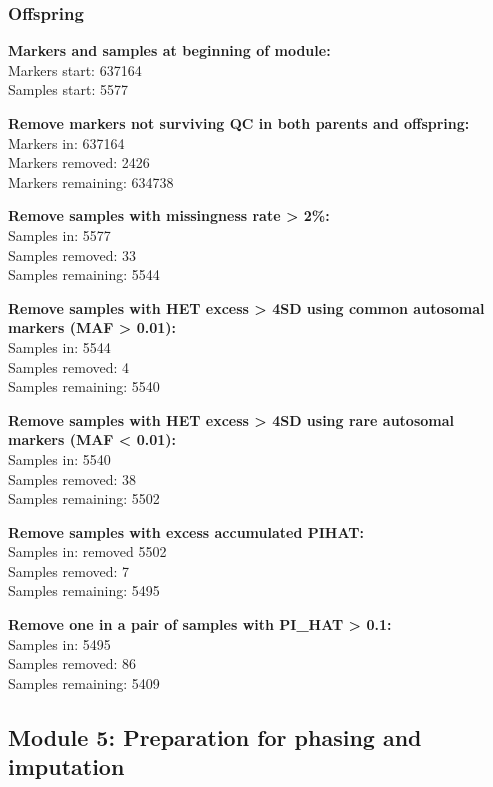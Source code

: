 \documentclass[]{article}
\begin{document}
\subsubsection{Offspring}\label{offspring-1}

\textbf{Markers and samples at beginning of module:}\\
Markers start: 637164\\
Samples start: 5577

\textbf{Remove markers not surviving QC in both parents and
offspring:}\\
Markers in: 637164\\
Markers removed: 2426\\
Markers remaining: 634738

\textbf{Remove samples with missingness rate \textgreater{} 2\%:}\\
Samples in: 5577\\
Samples removed: 33\\
Samples remaining: 5544

\textbf{Remove samples with HET excess \textgreater{} 4SD using common
autosomal markers (MAF \textgreater{} 0.01):}\\
Samples in: 5544\\
Samples removed: 4\\
Samples remaining: 5540

\textbf{Remove samples with HET excess \textgreater{} 4SD using rare
autosomal markers (MAF \textless{} 0.01):}\\
Samples in: 5540\\
Samples removed: 38\\
Samples remaining: 5502

\textbf{Remove samples with excess accumulated PIHAT:}\\
Samples in: removed 5502\\
Samples removed: 7\\
Samples remaining: 5495

\textbf{Remove one in a pair of samples with PI\_HAT \textgreater{}
0.1:}\\
Samples in: 5495\\
Samples removed: 86\\
Samples remaining: 5409

\subsection{Module 5: Preparation for phasing and
imputation}\label{module-5-preparation-for-phasing-and-imputation}
\end{document}
